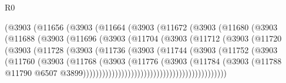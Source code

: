 \begin{lexlean}{R0}
\begin{coremodule}
                      (@3903
                        (@11656
                          (@3903
                            (@11664
                              (@3903
                                (@11672
                                  (@3903
                                    (@11680
                                      (@3903
                                        (@11688
                                          (@3903
                                            (@11696
                                              (@3903
                                                (@11704
                                                  (@3903
                                                    (@11712
                                                      (@3903
                                                        (@11720
                                                          (@3903
                                                            (@11728
                                                              (@3903
                                                                (@11736
                                                                  (@3903
                                                                    (@11744
                                                                      (@3903
                                                                        (@11752
                                                                          (@3903
                                                                            (@11760
                                                                              (@3903
                                                                                (@11768
                                                                                  (@3903
                                                                                    (@11776
                                                                                      (@3903
                                                                                        (@11784
                                                                                          (@3903
                                                                                            (@11788
                                                                                              @11790
                                                                                              @6507
                                                                                              @3899)))))))))))))))))))))))))))))))))))))))))))))

\end{coremodule}
\end{lexlean}
